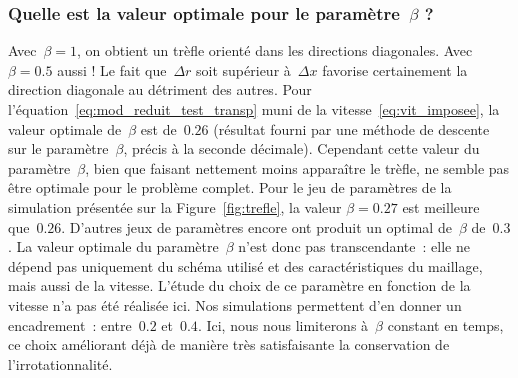 \documentclass[main.tex]{subfiles}
\begin{document}
\subsubsection{
Quelle est la valeur optimale pour le paramètre~$\beta$ ?} 
Avec~$\beta=1$, on obtient un trèfle orienté dans les directions diagonales. 
Avec~$\beta=0.5$ aussi ! Le fait que~$\Delta r$ soit supérieur à~$\Delta x$ favorise certainement la direction diagonale au détriment des autres. 
Pour l'équation~\eqref{eq:mod_reduit_test_transp} muni de la vitesse~\eqref{eq:vit_imposee}, la valeur optimale de~$\beta$ est de~$0.26$ (résultat fourni par une méthode de descente sur le paramètre~$\beta$, précis à la seconde décimale). 
Cependant cette valeur du paramètre~$\beta$, bien que faisant nettement moins apparaître le trèfle, ne semble pas être optimale pour le problème complet. Pour le jeu de paramètres de la simulation présentée sur la Figure~\ref{fig:trefle}, la valeur $\beta=0.27$ est meilleure que~$0.26$. D'autres jeux de paramètres encore ont produit un optimal de~$\beta$ de~$0.3$. 
La valeur optimale du paramètre~$\beta$ n'est donc pas transcendante~: elle ne dépend pas uniquement du schéma utilisé et des caractéristiques du maillage, mais aussi de la vitesse. L'étude du choix de ce paramètre en fonction de la vitesse n'a pas été réalisée ici. Nos simulations permettent d'en donner un encadrement~: entre~$0.2$ et~$0.4$. Ici, nous nous limiterons à~$\beta$ constant en temps, ce choix améliorant déjà de manière très satisfaisante la conservation de l'irrotationnalité.
\end{document}
